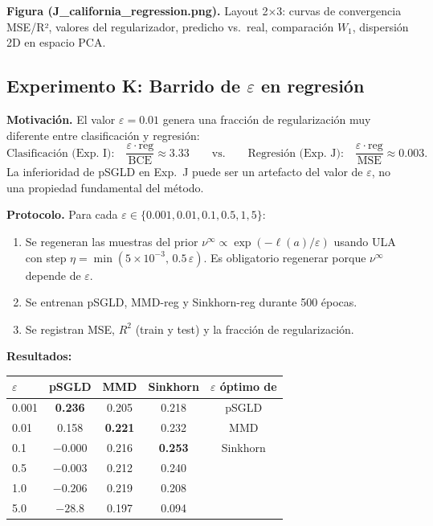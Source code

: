 \documentclass[11pt, a4paper]{article}
\theoremstyle{definition}
\begin{document}
\textbf{Figura (J\_california\_regression.png).} Layout 2×3:
curvas de convergencia MSE/R², valores del regularizador,
predicho vs.\ real, comparación $W_1$, dispersión 2D en espacio PCA.

\subsection{Experimento K: Barrido de $\varepsilon$ en regresión}
\label{sec:exp_k}

\textbf{Motivación.} El valor $\varepsilon=0.01$ genera una fracción de
regularización muy diferente entre clasificación y regresión:
\[
  \text{Clasificación (Exp.~I):}\quad
  \frac{\varepsilon\cdot\mathrm{reg}}{\text{BCE}} \approx 3.33
  \qquad\text{vs.}\qquad
  \text{Regresión (Exp.~J):}\quad
  \frac{\varepsilon\cdot\mathrm{reg}}{\text{MSE}} \approx 0.003.
\]
La inferioridad de pSGLD en Exp.~J puede ser un artefacto del valor de
$\varepsilon$, no una propiedad fundamental del método.

\textbf{Protocolo.} Para cada $\varepsilon \in \{0.001, 0.01, 0.1, 0.5, 1, 5\}$:
\begin{enumerate}
  \item Se regeneran las muestras del prior $\nu^\infty \propto \exp(-\ell(a)/\varepsilon)$
        usando ULA con step $\eta = \min(5\times10^{-3},\, 0.5\,\varepsilon)$.
        Es obligatorio regenerar porque $\nu^\infty$ depende de $\varepsilon$.
  \item Se entrenan pSGLD, MMD-reg y Sinkhorn-reg durante 500 épocas.
  \item Se registran MSE, $R^2$ (train y test) y la fracción de regularización.
\end{enumerate}

\textbf{Resultados:}
\begin{center}
\begin{tabular}{lcccc}
\toprule
$\varepsilon$ & pSGLD & MMD & Sinkhorn & $\varepsilon$ óptimo de\\
\midrule
0.001 & \textbf{0.236} & 0.205 & 0.218 & pSGLD\\
0.01  & 0.158 & \textbf{0.221} & 0.232 & MMD\\
0.1   & $-0.000$ & 0.216 & \textbf{0.253} & Sinkhorn\\
0.5   & $-0.003$ & 0.212 & 0.240 & \\
1.0   & $-0.206$ & 0.219 & 0.208 & \\
5.0   & $-28.8$  & 0.197 & 0.094 & \\
\bottomrule
\end{tabular}
\end{center}
\end{document}
